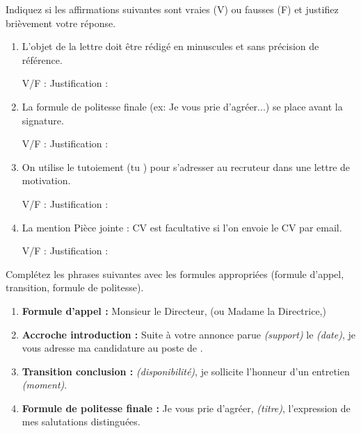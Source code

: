\documentclass[11pt]{article}
\begin{document}
\begin{exercice}
Indiquez si les affirmations suivantes sont vraies (V) ou fausses (F) et justifiez brièvement votre réponse.
\begin{enumerate}
    \item L'objet de la lettre doit être rédigé en minuscules et sans précision de référence. \dotfill
    \par\noindent V/F : \dotfill \quad Justification : \dotfill
    \item La formule de politesse finale (ex: \og Je vous prie d'agréer...\fg) se place avant la signature. \dotfill
    \par\noindent V/F : \dotfill \quad Justification : \dotfill
    \item On utilise le tutoiement (\og tu \fg) pour s'adresser au recruteur dans une lettre de motivation. \dotfill
    \par\noindent V/F : \dotfill \quad Justification : \dotfill
    \item La mention \og Pièce jointe : CV \fg est facultative si l'on envoie le CV par email. \dotfill
    \par\noindent V/F : \dotfill \quad Justification : \dotfill
\end{enumerate}
\end{exercice}

\begin{exercice}
Complétez les phrases suivantes avec les formules appropriées (formule d'appel, transition, formule de politesse).
\begin{enumerate}
    \item \textbf{Formule d'appel :} \dotfill Monsieur le Directeur, (ou \dotfill Madame la Directrice,)
    \item \textbf{Accroche introduction :} Suite à votre annonce parue \dotfill \textit{(support)} \dotfill le \textit{(date)}, je vous adresse ma candidature au poste de \dotfill.
    \item \textbf{Transition conclusion :} \dotfill \textit{(disponibilité)}, je sollicite l'honneur d'un entretien \dotfill \textit{(moment)}.
    \item \textbf{Formule de politesse finale :} Je vous prie d'agréer, \dotfill \textit{(titre)}, l'expression de mes salutations distinguées.
\end{enumerate}
\end{exercice}
\end{document}
